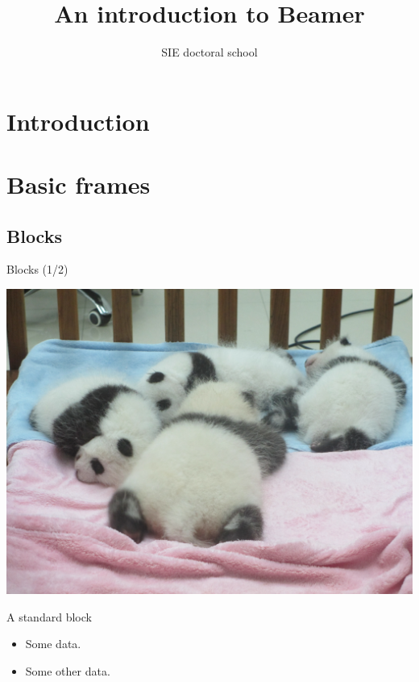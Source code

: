 \documentclass[11pt]{beamer}
\author{SIE doctoral school}
\title{An introduction to Beamer}
\institute{Université Savoie Mont Blanc}
\begin{document}
\section{Introduction}

\begin{frame}[plain] %
    \titlepage
\end{frame}

\begin{frame}
    \tableofcontents
\end{frame}

\section{Basic frames}


\subsection{Blocks}

\begin{frame}{Blocks (1/2)}
    \begin{center}
        \includegraphics[width = .55\textwidth]{../figures/panda_puppies}
    \end{center}

    \begin{block}{A standard block}
        \begin{itemize}
            \item Some data.
            \item Some other data.
        \end{itemize}
    \end{block}
\end{frame}
\end{document}

